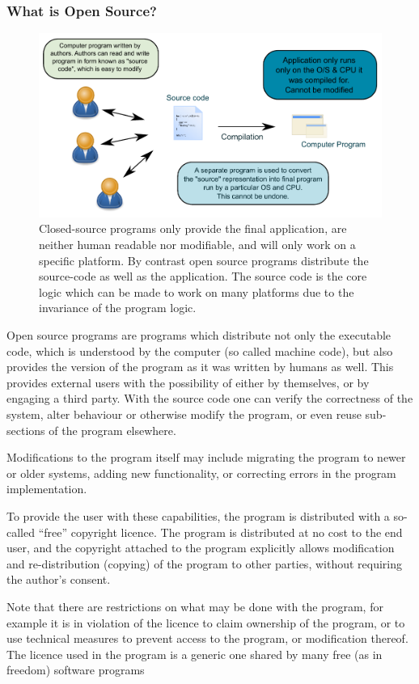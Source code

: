 \documentclass[10pt]{article}
\begin{document}
\subsubsection{What is Open Source?}
\begin{figure}
 \includegraphics[width=0.7 \textwidth,keepaspectratio=true]{./figures/compilation.pdf}
 \caption{Closed-source programs only provide the final application, are neither human readable nor modifiable, and will only work on a specific platform. By contrast open source programs distribute the source-code as well as the application. The source code is the core logic which can be made to work on many platforms due to the invariance of the program logic.}
 \label{fig:compilation}
\end{figure}
Open source programs are programs which distribute not only the executable code, which is understood by the computer (so called machine code), but also provides the version of the program as it was written by humans as well. This provides external users with the possibility of either by themselves, or by engaging a third party. With the source code one can verify the correctness of the system, alter behaviour or otherwise modify the program, or even reuse sub-sections of the program elsewhere. 

Modifications to the program itself may include migrating the program to newer or older systems, adding new functionality, or correcting errors in the program implementation.  
 
To provide the user with these capabilities, the program is distributed with a so-called ``free'' copyright licence. The program is distributed at no cost to the end user, and the copyright attached to the program explicitly allows modification and re-distribution (copying) of the program to other parties, without requiring the author's consent.  

Note that there are restrictions on what may be done with the program, for example it is in violation of the licence to claim ownership of the program, or to use technical measures to prevent access to the program, or modification thereof. The licence used in the program is a generic one shared by many free (as in freedom) software programs  
\end{document}
